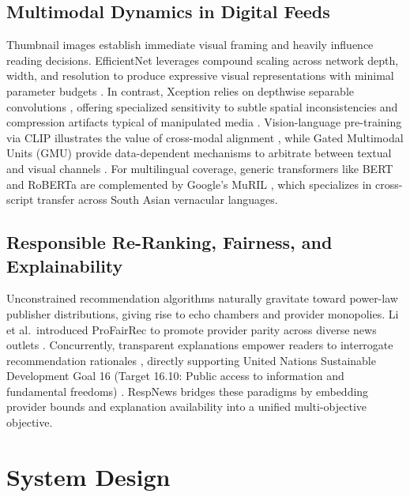\documentclass[conference]{IEEEtran}
\begin{document}
\subsection{Multimodal Dynamics in Digital Feeds}
Thumbnail images establish immediate visual framing and heavily influence reading decisions. EfficientNet leverages compound scaling across network depth, width, and resolution to produce expressive visual representations with minimal parameter budgets \cite{tan_efficientnet}. In contrast, Xception relies on depthwise separable convolutions \cite{chollet_xception}, offering specialized sensitivity to subtle spatial inconsistencies and compression artifacts typical of manipulated media \cite{rossler_faceforensics,wang_cnngenerated}. Vision-language pre-training via CLIP illustrates the value of cross-modal alignment \cite{radford_clip}, while Gated Multimodal Units (GMU) provide data-dependent mechanisms to arbitrate between textual and visual channels \cite{arevalo_gmu,liu_multimodal_rec}. For multilingual coverage, generic transformers like BERT \cite{devlin_bert} and RoBERTa \cite{liu_roberta} are complemented by Google's MuRIL \cite{khanuja_muril}, which specializes in cross-script transfer across South Asian vernacular languages.

\subsection{Responsible Re-Ranking, Fairness, and Explainability}
Unconstrained recommendation algorithms naturally gravitate toward power-law publisher distributions, giving rise to echo chambers and provider monopolies. Li et al.\ introduced ProFairRec to promote provider parity across diverse news outlets \cite{li_profai}. Concurrently, transparent explanations empower readers to interrogate recommendation rationales \cite{ribeiro_lime}, directly supporting United Nations Sustainable Development Goal 16 (Target 16.10: Public access to information and fundamental freedoms) \cite{sdg}. RespNews bridges these paradigms by embedding provider bounds and explanation availability into a unified multi-objective objective.

\section{System Design}
\end{document}
